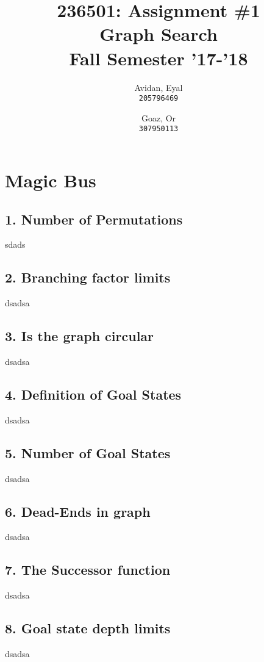 \documentclass{article}
\begin{document}
\title{%
  236501: Assignment \#1 \\
  \large Graph Search \\
    Fall Semester '17-'18}

\author{
  Avidan, Eyal \\
  \texttt{205796469}
  \and
  Goaz, Or \\
  \texttt{307950113}
}

\maketitle

\section*{Magic Bus}
\subsection*{1. Number of Permutations}
sdads
 
\subsection*{2. Branching factor limits}
dsadsa

\subsection*{3. Is the graph circular}
dsadsa

\subsection*{4. Definition of Goal States}
dsadsa

\subsection*{5. Number of Goal States}
dsadsa

\subsection*{6. Dead-Ends in graph}
dsadsa

\subsection*{7. The \textbf{Successor} function}
dsadsa

\subsection*{8. Goal state depth limits}
dsadsa
\end{document}
